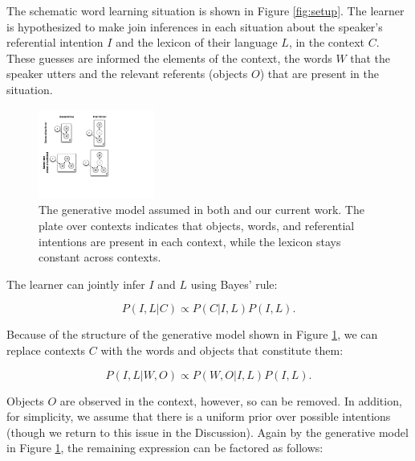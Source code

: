 \documentclass[man,noapacite,12pt]{apa2}
\begin{document}
The schematic word learning situation is shown in Figure \ref{fig:setup}. The learner is hypothesized to make join inferences in each situation about the speaker's referential intention $I$ and the lexicon of their language $L$, in the context $C$. These guesses are informed the elements of the context, the words $W$ that the speaker utters and the relevant referents (objects $O$) that are present in the situation. 


\begin{figure}[tr]
\begin{center}
\includegraphics[width=1.5in]{figures/gen_mod.pdf}
\caption{\label{fig:genmod} The generative model assumed in both \protect{} and our current work. The plate over contexts indicates that objects, words, and referential intentions are present in each context, while the lexicon stays constant across contexts.}
\end{center}
\end{figure}

The learner can jointly infer $I$ and $L$ using Bayes' rule:

\begin{equation}
P( I, L | C) \propto P(C | I, L ) P(I, L).
\end{equation}

\noindent Because of the structure of the generative model shown in Figure \ref{fig:genmod}, we can replace contexts $C$ with the words and objects that constitute them:


\begin{equation}
P( I, L | W, O) \propto P(W, O | I, L) P(I, L).
\end{equation}


\noindent Objects $O$ are observed in the context, however, so can be removed. In addition, for simplicity, we assume that there is a uniform prior over possible intentions (though we return to this issue in the Discussion). Again by the generative model in Figure \ref{fig:genmod}, the remaining expression can be factored as follows:
\end{document}
